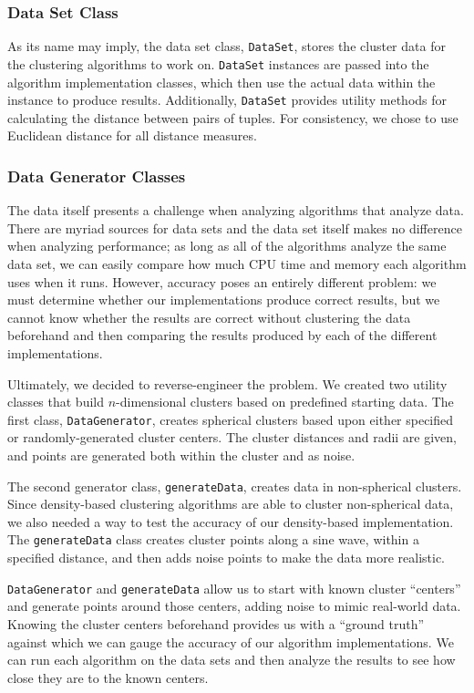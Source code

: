 \documentclass[11pt,letterpaper]{article}
\begin{document}
\subsubsection{Data Set Class}
As its name may imply, the data set class, \verb+DataSet+, stores the cluster data for the clustering algorithms to work on.  \verb+DataSet+ instances are passed into the algorithm implementation classes, which then use the actual data within the instance to produce results.  Additionally, \verb+DataSet+ provides utility methods for calculating the distance between pairs of tuples.  For consistency, we chose to use Euclidean distance for all distance measures.

\subsubsection{Data Generator Classes}
The data itself presents a challenge when analyzing algorithms that analyze data.  There are myriad sources for data sets and the data set itself makes no difference when analyzing performance; as long as all of the algorithms analyze the same data set, we can easily compare how much CPU time and memory each algorithm uses when it runs.  However, accuracy poses an entirely different problem:  we must determine whether our implementations produce correct results, but we cannot know whether the results are correct without clustering the data beforehand and then comparing the results produced by each of the different implementations.

Ultimately, we decided to reverse-engineer the problem.  We created two utility classes that build $n$-dimensional clusters based on predefined starting data.  The first class, \verb+DataGenerator+, creates spherical clusters based upon either specified or randomly-generated cluster centers.  The cluster distances and radii are given, and points are generated both within the cluster and as noise.

The second generator class, \verb+generateData+, creates data in non-spherical clusters.  Since density-based clustering algorithms are able to cluster non-spherical data, we also needed a way to test the accuracy of our density-based implementation.  The \verb+generateData+ class creates cluster points along a sine wave, within a specified distance, and then adds noise points to make the data more realistic.

\verb+DataGenerator+ and \verb+generateData+ allow us to start with known cluster ``centers'' and generate points around those centers, adding noise to mimic real-world data.  Knowing the cluster centers beforehand provides us with a ``ground truth'' against which we can gauge the accuracy of our algorithm implementations.  We can run each algorithm on the data sets and then analyze the results to see how close they are to the known centers.
\end{document}
